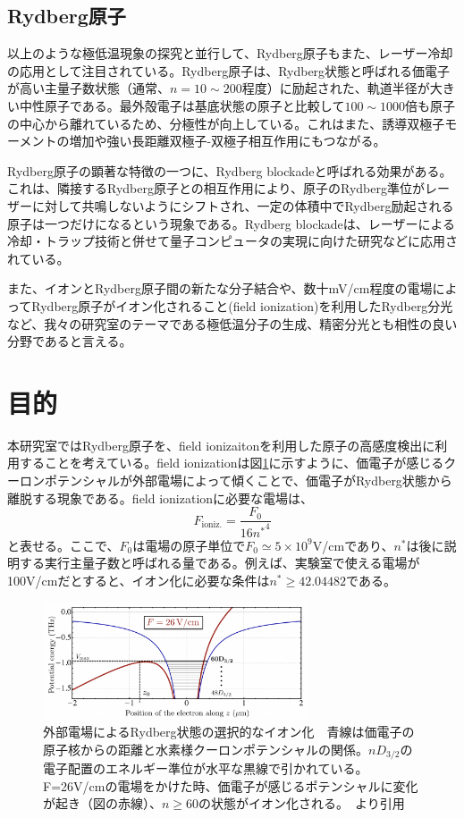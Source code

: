 \documentclass[dvipdfmx]{jsreport}
\begin{document}
\subsection{Rydberg原子}
以上のような極低温現象の探究と並行して、Rydberg原子もまた、レーザー冷却の応用として注目されている。Rydberg原子は、Rydberg状態と呼ばれる価電子が高い主量子数状態（通常、$n=10\sim200$程度）に励起された、軌道半径が大きい中性原子である。最外殻電子は基底状態の原子と比較して$100\sim1000$倍も原子の中心から離れているため、分極性が向上している\cite{rydberg}。これはまた、誘導双極子モーメントの増加や強い長距離双極子-双極子相互作用にもつながる。

Rydberg原子の顕著な特徴の一つに、Rydberg blockadeと呼ばれる効果がある。これは、隣接するRydberg原子との相互作用により、原子のRydberg準位がレーザーに対して共鳴しないようにシフトされ、一定の体積中でRydberg励起される原子は一つだけになるという現象である。Rydberg blockadeは、レーザーによる冷却・トラップ技術と併せて量子コンピュータの実現に向けた研究などに応用されている。\cite{yuma}

また、イオンとRydberg原子間の新たな分子結合\cite{ion-rydberg}や、数十mV/cm程度の電場によってRydberg原子がイオン化されること(field ionization)を利用したRydberg分光\cite{yuma}など、我々の研究室のテーマである極低温分子の生成、精密分光とも相性の良い分野であると言える。
\section{目的}
本研究室ではRydberg原子を、field ionizaitonを利用した原子の高感度検出に利用することを考えている。field ionizationは図\ref{fig:ionize}に示すように、価電子が感じるクーロンポテンシャルが外部電場によって傾くことで、価電子がRydberg状態から離脱する現象である。field ionizationに必要な電場は、
\begin{equation}
    F_{\text{ioniz.}} = \frac{F_0}{16 {n^*}^4}
\end{equation}
と表せる。\cite{rucas}ここで、$F_0$は電場の原子単位で$F_0 \simeq 5 \times 10^9$V/cmであり、$n^*$は後に説明する実行主量子数と呼ばれる量である。例えば、実験室で使える電場が100V/cmだとすると、イオン化に必要な条件は$n^* \geq 42.04482$である。
\begin{figure}[hbtp]
\centering
\includegraphics[width=0.7\textwidth]{images/ionize.png}
\caption{\label{fig:ionize}外部電場によるRydberg状態の選択的なイオン化　青線は価電子の原子核からの距離と水素様クーロンポテンシャルの関係。$nD_{3/2}$の電子配置のエネルギー準位が水平な黒線で引かれている。F=26V/cmの電場をかけた時、価電子が感じるポテンシャルに変化が起き（図の赤線）、$n \geq 60$の状態がイオン化される。　\cite{rucas}より引用}
\end{figure}
\end{document}
